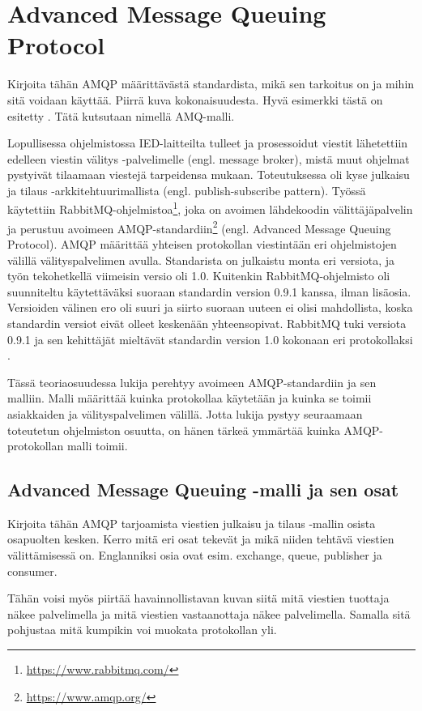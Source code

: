 \section{Advanced Message Queuing Protocol}
\begin{it}
	Kirjoita tähän AMQP määrittävästä standardista, mikä sen tarkoitus on ja mihin sitä voidaan käyttää.
	Piirrä kuva kokonaisuudesta. Hyvä esimerkki tästä on esitetty \cite[s.~11]{AMQP-specification}. Tätä kutsutaan nimellä AMQ-malli.
\end{it}
Lopullisessa ohjelmistossa IED-laitteilta tulleet ja prosessoidut viestit lähetettiin edelleen viestin välitys -palvelimelle (engl. message broker), mistä muut ohjelmat pystyivät tilaamaan viestejä tarpeidensa mukaan. Toteutuksessa oli kyse julkaisu ja tilaus -arkkitehtuurimallista (engl. publish-subscribe pattern). Työssä käytettiin RabbitMQ-ohjelmistoa\footnote{\url{https://www.rabbitmq.com/}}, joka on avoimen lähdekoodin välittäjäpalvelin ja perustuu avoimeen AMQP-standardiin\footnote{\url{https://www.amqp.org/}} (engl. Advanced Message Queuing Protocol). AMQP määrittää yhteisen protokollan viestintään eri ohjelmistojen välillä välityspalvelimen avulla. Standarista on julkaistu monta eri versiota, ja työn tekohetkellä viimeisin versio oli 1.0. Kuitenkin RabbitMQ-ohjelmisto oli suunniteltu käytettäväksi suoraan standardin version 0.9.1 kanssa, ilman lisäosia. Versioiden välinen ero oli suuri ja siirto suoraan uuteen ei olisi mahdollista, koska standardin versiot eivät olleet keskenään yhteensopivat. RabbitMQ tuki versiota 0.9.1 ja sen kehittäjät mieltävät standardin version 1.0 kokonaan eri protokollaksi \cite{RabbitMQ-Compatibility-and-Conformance}.

Tässä teoriaosuudessa lukija perehtyy avoimeen AMQP-standardiin ja sen malliin. Malli määrittää kuinka protokollaa käytetään ja kuinka se toimii asiakkaiden ja välityspalvelimen välillä. Jotta lukija pystyy seuraamaan toteutetun ohjelmiston osuutta, on hänen tärkeä ymmärtää kuinka AMQP-protokollan malli toimii.


\subsection{Advanced Message Queuing -malli ja sen osat}
\begin{it}
	Kirjoita tähän AMQP tarjoamista viestien julkaisu ja tilaus -mallin osista osapuolten kesken. Kerro mitä eri osat tekevät ja mikä niiden tehtävä viestien välittämisessä on. Englanniksi osia ovat esim. exchange, queue, publisher ja consumer.

	Tähän voisi myös piirtää havainnollistavan kuvan siitä mitä viestien tuottaja näkee palvelimella ja mitä viestien vastaanottaja näkee palvelimella. Samalla sitä pohjustaa mitä kumpikin voi muokata protokollan yli.
\end{it}



